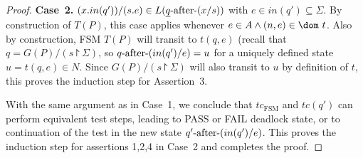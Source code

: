 \begin{proof}
\medskip
\noindent
{\bf Case~2.} $(x.in(q'))/(s.e) \in L(\underline{q}\text{-after-} (x/s))$ with $e\in in(q')\subseteq\Sigma$.\newline
By construction of $T(P)$, this case applies whenever $e\in A\wedge (n,e)\in\dom~t$.
Also by construction, FSM $T(P)$ will transit to $t(q,e)$ (recall that
$q = G(P)/(s\project \Sigma)$, so
$q\text{-after-}(in(q')/e) = u$ for a uniquely defined state $u= t(q,e) \in N$. Since
$G(P)/(s\project \Sigma)$ will also transit to $u$ by definition of $t$, this proves the induction step for Assertion~3.

With the same argument as in Case~1, we conclude that $tc_\text{FSM}$ and
$tc(q')$ can perform equivalent test steps, leading to PASS or FAIL deadlock state,
or to continuation of the test in the new state $q'\text{-after-}(in(q')/e)$.
This proves the induction step for assertions 1,2,4 in Case~2 and completes the proof.
\end{proof}


